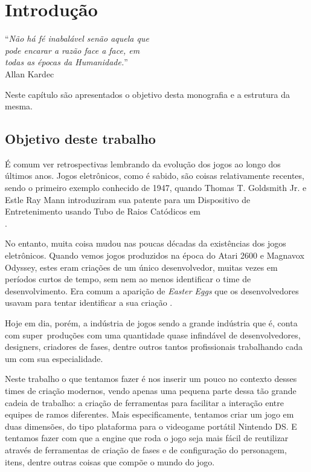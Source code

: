 \documentclass[brazil]{abnt}
\begin{document}
\tableofcontents{}
\listoffigures
\listoftables

\chapter{Introdução\label{cap:introducao}}

\vfill{}
\begin{flushright}{}``\emph{Não há fé inabalável senão aquela que}\\
\emph{pode encarar a razão face a face, em}\\
\emph{todas as épocas da Humanidade.}''\\
{\small Allan Kardec}\end{flushright}{\small \par}
\vfill{}

Neste capítulo são apresentados o objetivo desta monografia e a estrutura
da mesma.
\newpage


\section{Objetivo deste trabalho}

É comum ver retrospectivas lembrando da evolução dos jogos ao longo dos últimos anos. Jogos eletrônicos, como é sabido, são coisas relativamente recentes, sendo o primeiro exemplo conhecido de 1947, quando Thomas T. Goldsmith Jr. e Estle Ray Mann introduziram sua patente para um Dispositivo de Entretenimento usando Tubo de Raios Catódicos em \\\cite{2455992}.

No entanto, muita coisa mudou nas poucas décadas da existências dos jogos eletrônicos. Quando vemos jogos produzidos na época do Atari 2600 e Magnavox Odyssey, estes eram criações de um único desenvolvedor, muitas vezes em períodos curtos de tempo, sem nem ao menos identificar o time de desenvolvimento. Era comum a aparição de \textit{Easter Eggs} que os desenvolvedores usavam para tentar identificar a sua criação \cite{PrimeiroDevName}.

Hoje em dia, porém, a indústria de jogos sendo a grande indústria que é, conta com super~produções com uma quantidade quase infindável de desenvolvedores, designers, criadores de fases, dentre outros tantos profissionais trabalhando cada um com sua especialidade.

Neste trabalho o que tentamos fazer é nos inserir um pouco no contexto desses times de criação modernos, vendo apenas uma pequena parte dessa tão grande cadeia de trabalho: a criação de ferramentas para facilitar a interação entre equipes de ramos diferentes. Mais especificamente, tentamos criar um jogo em duas dimensões, do tipo plataforma para o videogame portátil Nintendo DS. E tentamos fazer com que a engine que roda o jogo seja mais fácil de reutilizar através de ferramentas de criação de fases e de configuração do personagem, itens, dentre outras coisas que compõe o mundo do jogo.
\end{document}
